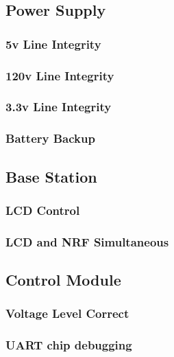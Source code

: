 
\subsection{Power Supply}

\subsubsection{5v Line Integrity}

\subsubsection{120v Line Integrity}

\subsubsection{3.3v Line Integrity}

\subsubsection{Battery Backup}

\subsection{Base Station}

\subsubsection{LCD Control}

\subsubsection{LCD and NRF Simultaneous}

\subsection{Control Module}

\subsubsection{Voltage Level Correct}

\subsubsection{UART chip debugging}

